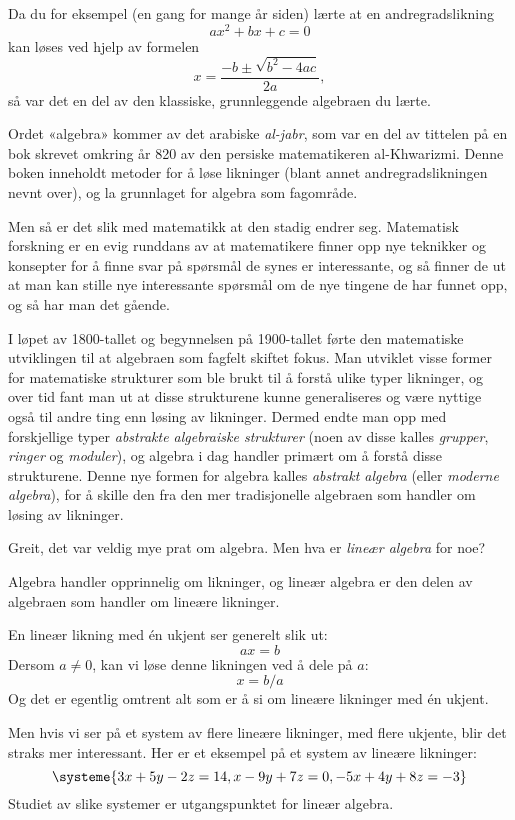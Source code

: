 \smallskip

Da du for eksempel (en gang for mange år siden) lærte at en
andregradslikning
\[
ax^2 + bx + c = 0
\]
kan løses ved hjelp av formelen
\[
x = \frac{-b \pm \sqrt{b^2 - 4ac}}{2a},
\]
så var det en del av den klassiske, grunnleggende algebraen du lærte.

\smallskip

Ordet «algebra» kommer av det arabiske \emph{al-jabr}, som var en del
av tittelen på en bok skrevet omkring år 820 av den persiske
matematikeren al-Khwarizmi.  Denne boken inneholdt metoder for å løse
likninger (blant annet andregradslikningen nevnt over), og la
grunnlaget for algebra som fagområde.

Men så er det slik med matematikk at den stadig endrer seg.
Matematisk forskning er en evig runddans av at matematikere finner opp
nye teknikker og konsepter for å finne svar på spørsmål de synes er
interessante, og så finner de ut at man kan stille nye interessante
spørsmål om de nye tingene de har funnet opp, og så har man det
gående.

I løpet av 1800-tallet og begynnelsen på 1900-tallet førte den
matematiske utviklingen til at algebraen som fagfelt skiftet fokus.
Man utviklet visse former for matematiske strukturer som ble
brukt til å forstå ulike typer likninger, og over tid fant man ut at
disse strukturene kunne generaliseres og være nyttige også til andre
ting enn løsing av likninger.  Dermed endte man opp med forskjellige
typer \emph{abstrakte algebraiske strukturer} (noen av disse kalles
\emph{grupper}, \emph{ringer} og \emph{moduler}), og algebra i dag
handler primært om å forstå disse strukturene.  Denne nye formen for
algebra kalles \emph{abstrakt algebra} (eller \emph{moderne algebra}),
for å skille den fra den mer tradisjonelle algebraen som handler om
løsing av likninger.

\medskip
Greit, det var veldig mye prat om algebra.  Men hva er \emph{lineær
  algebra} for noe?

Algebra handler opprinnelig om likninger, og lineær algebra er den
delen av algebraen som handler om lineære likninger.

En lineær likning med én ukjent ser generelt slik ut:
\[
ax = b
\]
Dersom $a \ne 0$, kan vi løse denne likningen ved å dele på $a$:
\[
x = b/a
\]
Og det er egentlig omtrent alt som er å si om lineære likninger med én
ukjent.

Men hvis vi ser på et system av flere lineære likninger, med flere
ukjente, blir det straks mer interessant.  Her er et eksempel på et
system av lineære likninger:
\[
\systeme{
  3x + 5y - 2z = 14,
   x - 9y + 7z = 0,
 -5x + 4y + 8z = -3
}
\]
Studiet av slike systemer er utgangspunktet for lineær algebra.

